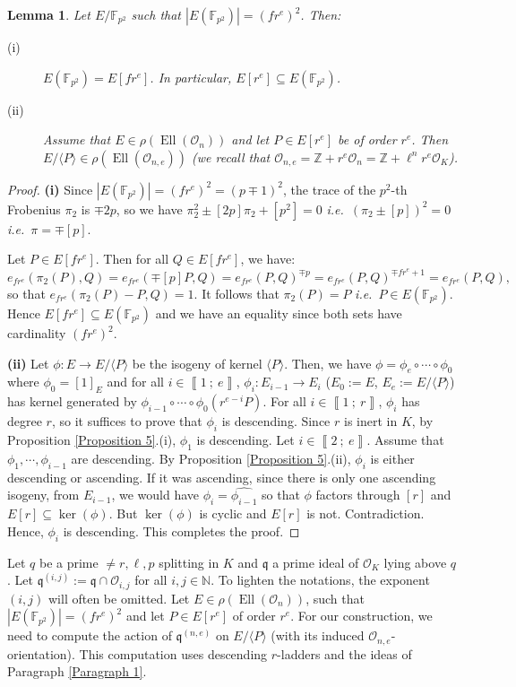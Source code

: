 \documentclass[a4paper,10pt,notitlepage]{report}
\theoremstyle{definition}
\theoremstyle{plain}
\newtheorem{Lemma}[Definition]{Lemma}
\theoremstyle{definition}
\newcommand{\ie}{\emph{i.e.}\ }
\newcommand{\N}{\mathbb{N}}
\newcommand{\Z}{\mathbb{Z}}
\newcommand{\F}{\mathbb{F}}
\newcommand{\mO}{\mathcal{O}}
\renewcommand{\i}[2]{\left\llbracket #1~;~#2\right\rrbracket}
\renewcommand{\(}{\left(}
\renewcommand{\)}{\right)}
\newcommand{\mf}[1]{\mathfrak{#1}}
\DeclareMathOperator{\Ell}{Ell}
\begin{document}
\begin{Lemma}\label{Lemma 7}
Let $E/\F_{p^2}$ such that $|E(\F_{p^2})|=(f r^e)^2$. Then:
\begin{description}
\item[(i)] $E(\F_{p^2})=E[fr^e]$. In particular, $E[r^e]\subseteq E(\F_{p^2})$.
\item[(ii)] Assume that $E\in\rho(\Ell(\mO_n))$ and let $P\in E[r^e]$ be of order $r^e$. Then $E/\langle P\rangle\in \rho(\Ell(\mO_{n,e}))$ (we recall that $\mO_{n,e}=\Z+r^e\mO_n=\Z+\ell^n r^e\mO_K$).
\end{description}
\end{Lemma}

\begin{proof}
\textbf{(i)} Since $|E(\F_{p^2})|=(f r^e)^2=(p\mp 1)^2$, the trace of the $p^2$-th Frobenius $\pi_2$ is $\mp 2p$, so we have $\pi_2^2\pm [2p]\pi_2+[p^2]=0$ \ie $(\pi_2\pm[p])^2=0$ \ie $\pi=\mp[p]$. 

Let $P\in E[fr^e]$. Then for all $Q\in E[fr^e]$, we have:
\[e_{fr^e}(\pi_2(P),Q)=e_{fr^e}(\mp[p]P,Q)= e_{fr^e}(P,Q)^{\mp p}=e_{fr^e}(P,Q)^{\mp fr^e+1}=e_{fr^e}(P,Q),\]
so that $e_{fr^e}(\pi_2(P)-P,Q)=1$. It follows that $\pi_2(P)=P$ \ie $P\in E(\F_{p^2})$. Hence $E[fr^e]\subseteq E(\F_{p^2})$ and we have an equality since both sets have cardinality $(fr^e)^2$.

\textbf{(ii)} Let $\phi : E\longrightarrow E/\langle P\rangle$ be the isogeny of kernel $\langle P\rangle$. Then, we have $\phi=\phi_e\circ\cdots\circ\phi_0$ where $\phi_0=[1]_E$ and for all $i\in\i{1}{e}$, $\phi_i :E_{i-1}\longrightarrow E_i$ ($E_0:=E$, $E_e:=E/\langle P\rangle$) has kernel generated by $\phi_{i-1}\circ\cdots\circ\phi_0(r^{e-i}P)$. For all $i\in\i{1}{r}$, $\phi_i$ has degree $r$, so it suffices to prove that $\phi_i$ is descending.  Since $r$ is inert in $K$, by Proposition \ref{Proposition 5}.(i), $\phi_1$ is descending. Let $i\in\i{2}{e}$. Assume that $\phi_1, \cdots, \phi_{i-1}$ are descending. By Proposition \ref{Proposition 5}.(ii), $\phi_i$ is either descending or ascending. If it was ascending, since there is only one ascending isogeny, from $E_{i-1}$, we would have $\phi_i=\widehat{\phi_{i-1}}$ so that $\phi$ factors through $[r]$ and $E[r]\subseteq \ker(\phi)$. But $\ker(\phi)$ is cyclic and $E[r]$ is not. Contradiction. Hence, $\phi_i$ is descending. This completes the proof.
\end{proof}

Let $q$ be a prime $\neq r,\ell, p$ splitting in $K$ and $\mf{q}$ a prime ideal of $\mO_K$ lying above $q$. Let $\mf{q}^{(i,j)}:=\mf{q}\cap\mO_{i,j}$ for all $i, j\in\N$. To lighten the notations, the exponent $(i,j)$ will often be omitted. Let $E\in\rho(\Ell(\mO_n))$, such that $|E(\F_{p^2})|=(f r^e)^2$ and let $P\in E[r^e]$ of order $r^e$. For our construction, we need to compute the action of $\mf{q}^{(n,e)}$ on $E/\langle P\rangle$ (with its induced $\mO_{n,e}$-orientation).  This computation uses descending $r$-ladders and the ideas of Paragraph \ref{Paragraph 1}.
\end{document}
